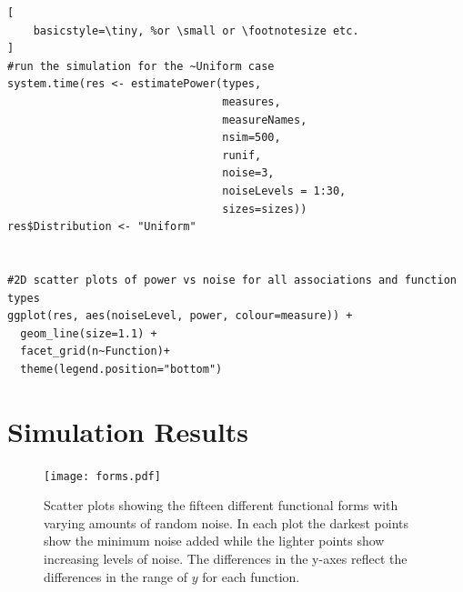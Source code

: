 \documentclass[a4paper, 12pt]{report}
\begin{document}
\begin{lstlisting}[
    basicstyle=\tiny, %or \small or \footnotesize etc.
]
#run the simulation for the ~Uniform case
system.time(res <- estimatePower(types, 
                                 measures, 
                                 measureNames, 
                                 nsim=500, 
                                 runif, 
                                 noise=3, 
                                 noiseLevels = 1:30, 
                                 sizes=sizes))
res$Distribution <- "Uniform"


#2D scatter plots of power vs noise for all associations and function types
ggplot(res, aes(noiseLevel, power, colour=measure)) +
  geom_line(size=1.1) +
  facet_grid(n~Function)+
  theme(legend.position="bottom")

\end{lstlisting}

\section{Simulation Results}

\begin{figure}[H]
\begin{centering}
\texttt{[image: forms.pdf]}
\caption{Scatter plots showing the fifteen different functional forms with varying amounts of random noise. In each plot the darkest points show the minimum noise added while the lighter points show increasing levels of noise. The differences in the y-axes reflect the differences in the range of $y$ for each function.} 
\label{F:FunctionFormsNoise}
\end{centering}
\end{figure}
\end{document}
